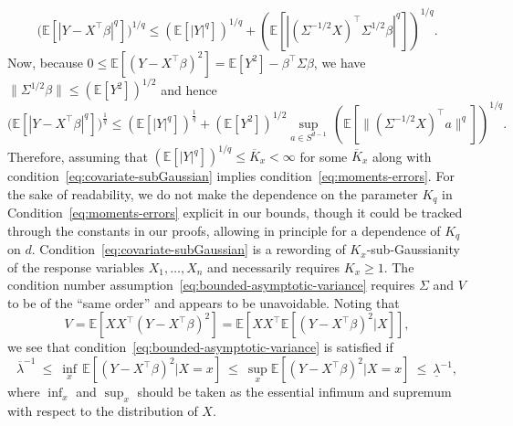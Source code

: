 \documentclass[11pt]{article}
\begin{document}
\[
\Big(\mathbb{E}[|Y - X^{\top}\beta|^q]\Big)^{1/q} \le \left(\mathbb{E}[|Y|^q]\right)^{1/q} + \left(\mathbb{E}[ |(\Sigma^{-1/2}X)^{\top}\Sigma^{1/2}\beta |^q]\right)^{1/q}.
\]
Now, because $0 \leq \mathbb{E}[(Y - X^{\top}\beta)^2] = \mathbb{E}[Y^2] - \beta^\top \Sigma \beta$, we have $\|\Sigma^{1/2}\beta\| \le (\mathbb{E}[Y^2])^{1/2}$ and hence
\[
\Big(\mathbb{E}[|Y - X^{\top}\beta|^q]\Big)^{\frac{1}{q}} \le \left(\mathbb{E}[|Y|^q]\right)^{\frac{1}{q}} + (\mathbb{E}[Y^2])^{1/2}\sup_{a\in S^{d-1}}\,\left(\mathbb{E}[\|(\Sigma^{-1/2}X)^{\top}a\|^q]\right)^{1/q}.
\]
Therefore, assuming that $(\mathbb{E}[|Y|^q])^{1/q} \le \overline{K}_x < \infty$ for some $\overline{K}_x$ along with condition~\ref{eq:covariate-subGaussian} implies condition~\ref{eq:moments-errors}. For the sake of readability, we do not make the dependence on the parameter $K_q$ in Condition~\ref{eq:moments-errors} explicit in our bounds, though it could be tracked through the constants in our proofs, allowing in principle for a dependence of $K_q$ on $d$.
Condition~\ref{eq:covariate-subGaussian} is a rewording of $K_x$-sub-Gaussianity of the response variables $X_1, \ldots, X_n$ and necessarily requires $K_x \ge 1$. The condition number assumption~\ref{eq:bounded-asymptotic-variance} requires $\Sigma$ and $V$ to be of the ``same order'' and appears to be unavoidable.  Noting that
\[
V = \mathbb{E}[XX^{\top}(Y - X^{\top}\beta)^2] = \mathbb{E}\left[XX^{\top}\mathbb{E}[(Y - X^{\top}\beta)^2|X]\right],
\]
we see that condition~\ref{eq:bounded-asymptotic-variance} is satisfied if
\[
\overline{\lambda}^{-1} ~\le~ \inf_{x}\,\mathbb{E}[(Y - X^{\top}\beta)^2|X = x] ~\le~ \sup_{x}\mathbb{E}[(Y - X^{\top}\beta)^2|X = x] ~\le~ \underline{\lambda}^{-1},
\]
where $\inf_x$ and $\sup_x$ should be taken as the essential infimum and supremum with respect to the distribution of $X$. 
\end{document}

